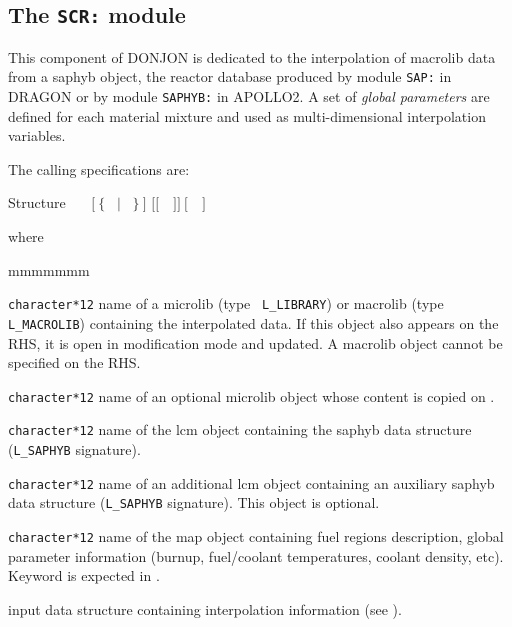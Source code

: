 \subsection{The {\tt SCR:} module}\label{sect:SCRData}

This component of DONJON is dedicated to the interpolation of
{\sc macrolib} data from a {\sc saphyb} object, the reactor database produced by module {\tt SAP:}
in DRAGON or by module {\tt SAPHYB:} in APOLLO2.\cite{apollo2} A set of {\sl global parameters} are defined for each material mixture and
used as multi-dimensional interpolation variables.

\vskip 0.02cm

The calling specifications are:

\begin{DataStructure}{Structure }
~\moc{:=}~~$[~\{$~ $|$ ~$\}~]$  $[[$~~$]]~[$~~$]$~\moc{::}~ \\
\end{DataStructure}

\noindent where
\begin{ListeDeDescription}{mmmmmmm}

\item[\dusa{MLIB}] {\tt character*12} name of a {\sc microlib} (type {\tt
L\_LIBRARY}) or {\sc macrolib} (type {\tt L\_MACROLIB}) containing the interpolated data. If this object also appears on the RHS, it is open in modification mode and updated. A {\sc macrolib} object cannot be specified on the RHS.

\item[\dusa{MLIB2}] {\tt character*12} name of an optional {\sc microlib} object whose content is copied on .

\item[\dusa{SAPNAM1}] {\tt character*12} name of the {\sc lcm} object containing the
{\sc saphyb} data structure ({\tt L\_SAPHYB} signature).

\item[\dusa{SAPNAM2}] {\tt character*12} name of an additional {\sc lcm} object containing an auxiliary
{\sc saphyb} data structure ({\tt L\_SAPHYB} signature). This object is optional.

\item[\dusa{MAPFL}] {\tt character*12} name of the {\sc map} object containing fuel regions description, global parameter
information (burnup, fuel/coolant temperatures, coolant density, etc). Keyword  is expected in .

\item[\dusa{scr\_data}] input data structure containing interpolation information (see ).

\end{ListeDeDescription}

